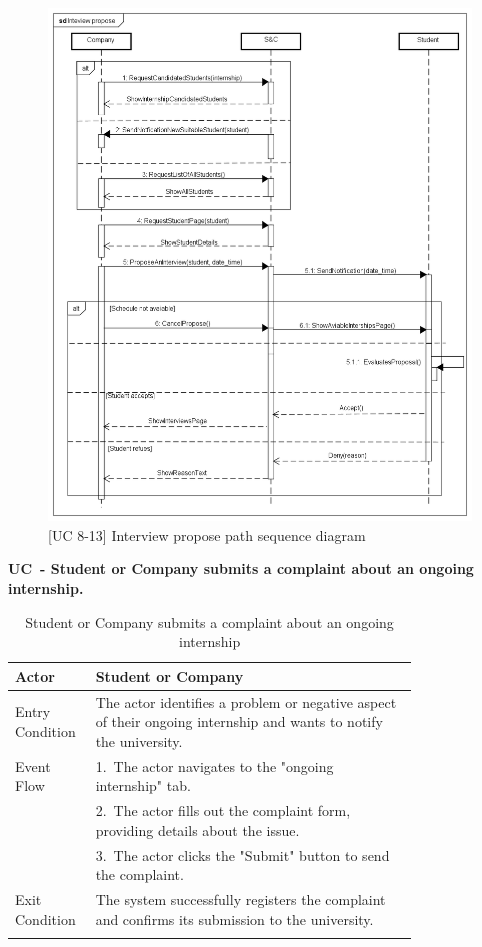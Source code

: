 \begin{figure}[H]
    \centering
    \includegraphics[width=1\linewidth]{Images/Sequence diagrams/Inteview propose.png}
    \caption{[UC 8-13] Interview propose path sequence diagram}
    \label{fig:enter-label}
\end{figure}

\textbf{UC\cuc\  - Student or Company submits a complaint about an ongoing internship.}

\begin{center} 
    \renewcommand{\arraystretch}{1.2} 
    \begin{longtable}{ l p{0.8\linewidth} } 
        \hline Actor & Student or Company \\ \hline 
        Entry Condition & The actor identifies a problem or negative aspect of their ongoing internship and wants to notify the university. \\ \hline 
        Event Flow & 1.\ The actor navigates to the "ongoing internship" tab. \\  
        & 2.\ The actor fills out the complaint form, providing details about the issue. \\ 
        & 3.\ The actor clicks the "Submit" button to send the complaint. \\ \hline 
        Exit Condition & The system successfully registers the complaint and confirms its submission to the university. \\ \hline
        \caption{Student or Company submits a complaint about an ongoing internship} 
        \label{tab:student_complaint_uc} 
    \end{longtable} 
\end{center}

